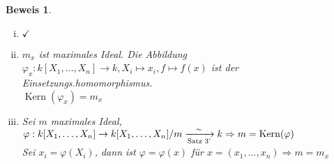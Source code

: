 \documentclass[a4paper,12pt]{report}
\theoremstyle{break}
\theoremstyle{nonumberbreak}
\newtheorem{Bew}{Beweis}
\theoremstyle{nonumberplain}
\DeclareMathOperator{\Kern}{Kern}
\begin{document}
\begin{Bew}\begin{enumerate}[(iii)]
\item[(i)$\to$(ii)] $\checkmark$

\item[(ii)$\to$(iii)]
$m_x$ ist maximales Ideal. Die Abbildung $\varphi_x:k[X_1,\dots ,X_n]\to k, X_i\mapsto x_i, f\mapsto f(x)$ ist der Einsetzungs.homomorphismus.\\
$\Kern(\varphi_x)=m_x$

\item[(iii)$\to$(i)]
Sei $m$ maximales Ideal, $\varphi:k[X_1,\dots ,X_n]\to k[X_1,\dots ,X_n]/m  \xrightarrow[\textrm{Satz 3'}]{\sim} k\\
\Rightarrow m=\Kern(\varphi)$\\
Sei $x_i=\varphi(X_i)$, dann ist $\varphi=\varphi(x)$ f\"ur $x=(x_1,\dots ,x_n) \Rightarrow m=m_x$
\end{enumerate}\end{Bew}
\end{document}
